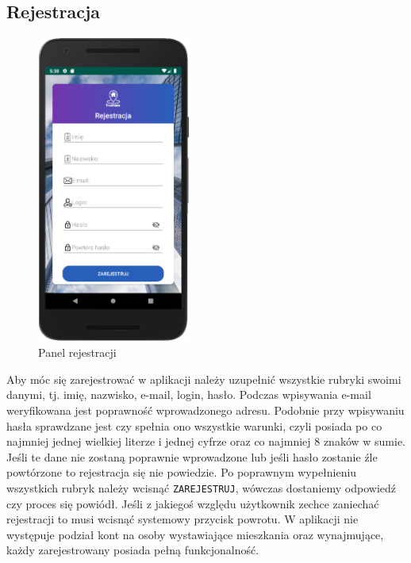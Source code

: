 \documentclass[polish, 11pt]{article}
\begin{document}
    \subsection{Rejestracja}
        \begin{figure}[H]
                    \centering
                    \includegraphics[width=0.45\textwidth]{aplikacja/rejestracja.png}
                    \caption{Panel rejestracji}
        \end{figure}
        
        Aby móc się zarejestrować w aplikacji należy uzupełnić wszystkie rubryki swoimi danymi, tj. imię, nazwisko, e-mail, login, hasło. Podczas wpisywania  e-mail weryfikowana jest poprawność wprowadzonego adresu. Podobnie przy wpisywaniu hasła sprawdzane jest czy spełnia ono wszystkie warunki, czyli posiada po co najmniej jednej wielkiej literze i jednej cyfrze oraz co najmniej 8 znaków w sumie. Jeśli te dane nie zostaną poprawnie wprowadzone lub jeśli hasło zostanie źle powtórzone to rejestracja się nie powiedzie. Po poprawnym wypełnieniu wszystkich rubryk należy wcisnąć \texttt{ZAREJESTRUJ}, wówczas dostaniemy odpowiedź czy proces się powiódł. Jeśli z jakiegoś względu użytkownik zechce zaniechać rejestracji to musi wcisnąć systemowy przycisk powrotu. W aplikacji nie występuje podział kont na osoby wystawiające mieszkania oraz wynajmujące, każdy zarejestrowany posiada pełną funkcjonalność.
\end{document}
